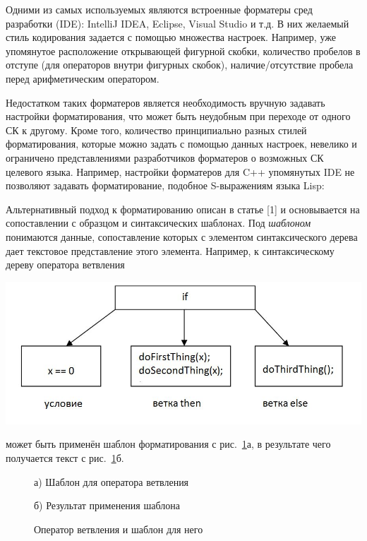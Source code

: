 \documentclass[conference]{IEEEtran}
\begin{document}
Одними из самых используемых являются встроенные форматеры
сред разработки (IDE): IntelliJ IDEA, Eclipse, Visual Studio и т.д.
В них желаемый стиль кодирования задается с помощью множества настроек.
Например, уже упомянутое расположение открывающей фигурной скобки,
количество пробелов в отступе (для операторов внутри фигурных скобок),
наличие/отсутствие пробела перед арифметическим оператором.

Недостатком таких форматеров является необходимость вручную задавать
настройки форматирования, что может быть неудобным при переходе
от одного СК к другому.
Кроме того, количество принципиально разных стилей форматирования,
которые можно задать с помощью данных настроек, невелико и ограничено
представлениями разработчиков форматеров о возможных СК целевого языка.
Например, настройки форматеров для C++ упомянутых IDE не позволяют задавать
форматирование, подобное S-выражениям языка Lisp:



Альтернативный подход к форматированию описан в статье [1] %
и основывается на сопоставлении с образцом и синтаксических шаблонах.
Под \emph{шаблоном} понимаются данные, сопоставление которых с элементом синтаксического дерева дает текстовое представление этого элемента.
Например, к синтаксическому дереву оператора ветвления
\vspace{.3cm}

{
\centering
\includegraphics[width=.5\textwidth]{images/ifTree.jpg}
}

\vspace{-.5cm}
\noindent
может быть применён шаблон форматирования с рис.~\ref{fig:tmpltcodeintro}а,
в результате чего получается текст с рис.~\ref{fig:tmpltcodeintro}б.

\begin{figure}[ht]
\noindent\begin{minipage}{.2\textwidth}
    
\caption*{а) Шаблон для оператора ветвления}    
\end{minipage}\hfill
\begin{minipage}{.25\textwidth}
    
\caption*{б) Результат применения шаблона}    
\end{minipage}
\caption{Оператор ветвления и шаблон для него}    
\label{fig:tmpltcodeintro}
\end{figure}
\end{document}
